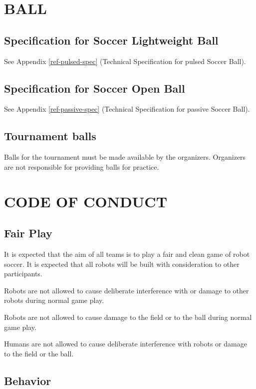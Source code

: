 \documentclass{article}
\begin{document}
\section{BALL \label{ref-038}}

\subsection{Specification for Soccer Lightweight Ball}

See Appendix \ref{ref-pulsed-spec} (Technical Specification for pulsed Soccer
Ball).

\subsection{Specification for Soccer Open Ball}

See Appendix \ref{ref-passive-spec} (Technical Specification for passive Soccer
Ball).

\subsection{ Tournament balls \label{ref-039}}

Balls for the tournament must be made available by the organizers. Organizers
are not responsible for providing balls for practice.

\section{CODE OF CONDUCT\label{ref-040}}

\subsection{ Fair Play \label{ref-041}}

It is expected that the aim of all teams is to play a fair and clean game of
robot soccer. It is expected that all robots will be built with consideration
to other participants.

Robots are not allowed to cause deliberate interference with or damage to other
robots during normal game play.

Robots are not allowed to cause damage to the field or to the ball during
normal game play.

Humans are not allowed to cause deliberate interference with robots or damage
to the field or the ball.

\subsection{ Behavior \label{ref-042}}
\end{document}
